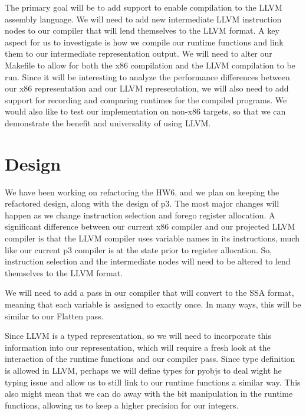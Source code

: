 \documentclass[11pt]{article}
\begin{document}
The primary goal will be to add support to enable compilation to the LLVM assembly language. 
We will need to add new intermediate LLVM instruction nodes to our compiler that will lend themselves to 
the LLVM format. A key aspect for us to investigate is how we compile our runtime
functions and link them to our intermediate representation output.
We will need to alter our Makefile to allow for both the x86 compilation and the LLVM
compilation to be run. Since it will be interesting to analyze the performance differences 
between our x86 representation and our LLVM representation, we will also need to
add support for recording and comparing runtimes for the compiled programs. 
We would also like to test our implementation on non-x86 targets, so that we can demonstrate
the benefit and universality of using LLVM.

\section{Design}

We have been working on refactoring the HW6, and we plan on keeping the refactored
design, along with the design of p3. The most major changes will happen as we change 
instruction selection and forego register allocation. A significant difference between
our current x86 compiler and our projected LLVM compiler is that the LLVM compiler 
uses variable names in its instructions, much like our current p3 compiler is at the state
prior to register allocation. So, instruction selection and the intermediate nodes will need to be
altered to lend themselves to the LLVM format. 

We will need to add a pass in our compiler that will convert to the SSA format, meaning
that each variable is assigned to exactly once. In many ways, this will be similar to our Flatten pass.

Since LLVM is a typed representation, so we will need to incorporate this information into 
our representation, which will require a fresh look at the interaction of the runtime functions 
and our compiler pass. Since type definition is allowed in LLVM, perhaps we will define types
for pyobjs to deal wight he typing issue and allow us to still link to our runtime functions a similar way.
This also might mean that we can do away with the bit manipulation in the runtime functions, allowing
us to keep a higher precision for our integers.
\end{document}
